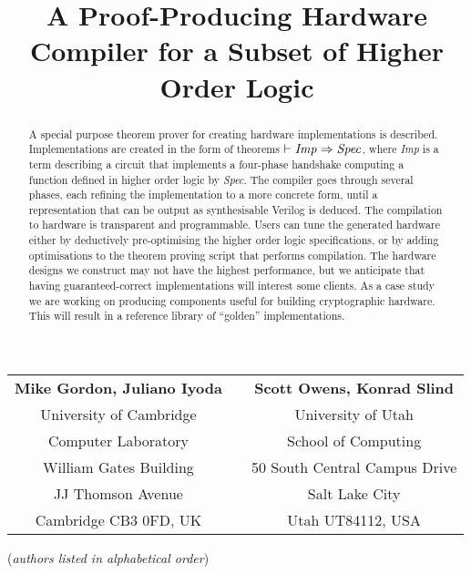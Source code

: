 \documentclass{llncs}
\title{A Proof-Producing Hardware Compiler for a Subset of Higher Order Logic}
\author{}
\institute{}
\begin{document}
\maketitle

\vspace*{-8mm}

\begin{center}
\begin{tabular}{ccc}
{\bf Mike Gordon, Juliano Iyoda} &\hspace*{5mm}& {\bf Scott Owens, Konrad Slind}\\
University of Cambridge          &\hspace*{5mm}& University of Utah\\
Computer Laboratory              &\hspace*{5mm}& School of Computing\\
William Gates Building           &\hspace*{5mm}& 50 South Central Campus Drive\\
JJ Thomson Avenue                &\hspace*{5mm}& Salt Lake City\\
Cambridge CB3 0FD, UK            &\hspace*{5mm}& Utah UT84112, USA
\end{tabular}


\vspace*{2mm}

({\it{authors listed in alphabetical order\/}})
\end{center}

\vspace*{-5mm}

\thispagestyle{empty}

\begin{abstract}
A special purpose theorem prover for creating hardware implementations
is described.  Implementations are created in the form of theorems
$\vdash {\it{Imp}}\Rightarrow{\it{Spec}}$, where {\it{Imp}} is a term
describing a circuit that implements a four-phase handshake computing
a function defined in higher order logic by {\it{Spec}}.  The compiler
goes through several phases, each refining the implementation to a
more concrete form, until a representation that can be output as
synthesisable Verilog is deduced.  The compilation to hardware is
transparent and programmable. Users can tune the generated hardware
either by deductively pre-optimising the higher order logic
specifications, or by adding optimisations to the theorem proving
script that performs compilation.  The hardware designs we construct
may not have the highest performance, but we anticipate that having
guaranteed-correct implementations will interest some clients.  As a
case study we are working on producing components useful for building
cryptographic hardware.  This will result in a reference library of
``golden'' implementations.


\end{abstract}
\end{document}
